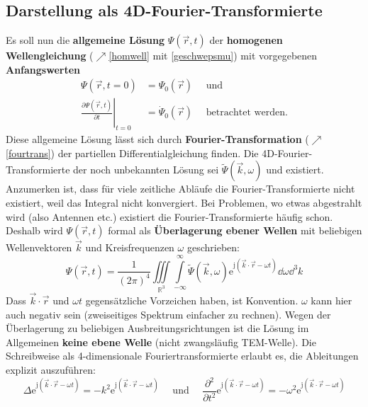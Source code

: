   \subsection{Darstellung als 4D-Fourier-Transformierte}
	  Es soll nun die \textbf{allgemeine Lösung} \(\Psi(\vec{r} ,t)\) der \textbf{homogenen Wellengleichung} ($\nearrow$\ref{homwell} mit \ref{geschwepsmu}) mit  vorgegebenen \textbf{Anfangswerten}
		        \begin{equation}\begin{split}
				        \Psi(\vec{r} ,t=0) &= \Psi_0(\vec{r} )\quad \text{ und}\\
				        \left.\frac{\partial \Psi(\vec{r} ,t)}{\partial t}\right|_{t=0} &= \dot{\Psi}_0(\vec{r} ) \quad\text{ betrachtet werden.}
			        \end{split}\end{equation}
		  Diese allgemeine Lösung lässt sich durch \textbf{Fourier-Transformation} ($\nearrow$\ref{fourtrans}) der partiellen Differentialgleichung finden. Die 4D-Fourier-Transformierte der noch unbekannten Lösung sei \(\tilde{\Psi}(\vec{k}, \omega)\) und existiert. Anzumerken ist, dass für viele zeitliche Abläufe die Fourier-Transformierte nicht existiert, weil das Integral nicht konvergiert. Bei Problemen, wo etwas abgestrahlt wird (also Antennen etc.) existiert die Fourier-Transformierte häufig schon. Deshalb wird \(\Psi(\vec{r} , t)\) formal als \textbf{Überlagerung ebener Wellen} mit beliebigen Wellenvektoren \(\vec{k}\) und Kreisfrequenzen \(\omega\) geschrieben:
		        \begin{equation}
			        \Psi(\vec{r} , t) = \frac{1}{(2\pi)^4} \iiint\limits_{\mathbb{R}^3} \int\limits_{-\infty}^\infty \tilde{\Psi}(\vec{k}, \omega)  \mathrm{e}^{\mathrm{j}(\vec{k}\cdot\vec{r} -\omega t)} \dd \omega \dd^3k
		        \end{equation}
		   Dass $\vec{k}\cdot\vec{r}$ und $\omega t$ gegensätzliche Vorzeichen haben, ist Konvention. $\omega$ kann hier auch negativ sein (zweiseitiges Spektrum einfacher zu rechnen). Wegen der Überlagerung zu beliebigen Ausbreitungsrichtungen ist die Lösung im Allgemeinen \textbf{keine ebene Welle} (nicht zwangsläufig TEM-Welle).	 Die Schreibweise als 4-dimensionale Fouriertransformierte erlaubt es, die Ableitungen explizit auszuführen:
		        \begin{equation}
			        \Delta  \mathrm{e}^{\mathrm{j}(\vec{k}\cdot\vec{r} -\omega t)} = -k^2  \mathrm{e}^{\mathrm{j}(\vec{k}\cdot\vec{r} -\omega t)}\quad \text{ und }\quad \frac{\partial^2}{\partial t^2} \mathrm{e}^{\mathrm{j}(\vec{k}\cdot\vec{r} -\omega t)}= -\omega^2 \mathrm{e}^{\mathrm{j}(\vec{k}\cdot\vec{r} -\omega t)}
		        \end{equation}
